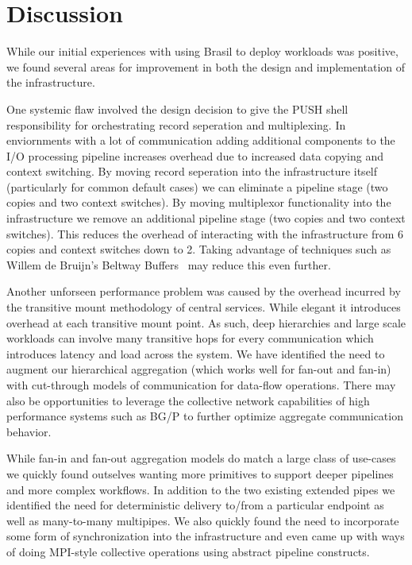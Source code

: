 \section{Discussion}

While our initial experiences with using Brasil to deploy
workloads was positive, we found several areas for improvement
in both the design and implementation of the infrastructure.

One systemic flaw involved the design decision to give the PUSH
shell responsibility for orchestrating record seperation and 
multiplexing.  In enviornments with a lot of communication 
adding additional components to the I/O processing pipeline 
increases overhead due to increased data copying and context
switching.  By moving record seperation into the infrastructure
itself (particularly for common default cases) we can eliminate
a pipeline stage (two copies and two context switches).  By moving
multiplexor functionality into the infrastructure we remove an
additional pipeline stage (two copies and two context switches).
This reduces the overhead of interacting with the infrastructure 
from 6 copies and context switches down to 2.  Taking advantage
of techniques such as Willem de Bruijn's Beltway Buffers~\cite{beltway}
may reduce this even further.

Another unforseen performance problem was caused by the overhead
incurred by the transitive mount methodology of central services.
While elegant it introduces overhead at each transitive mount point.
As such, deep hierarchies and large scale workloads can involve 
many transitive hops for every communication which introduces latency
and load across the system.  We have identified the need to augment
our hierarchical aggregation (which works well for fan-out and fan-in)
with cut-through models of communication for data-flow operations.
There may also be opportunities to leverage the collective network
capabilities of high performance systems such as BG/P to further
optimize aggregate communication behavior.

While fan-in and fan-out aggregation models do match a large class
of use-cases we quickly found outselves wanting more primitives to
support deeper pipelines and more complex workflows.  In addition
to the two existing extended pipes we identified the need for
deterministic delivery to/from a particular endpoint as well as
many-to-many multipipes.  We also quickly found the need to
incorporate some form of synchronization into the infrastructure
and even came up with ways of doing MPI-style collective operations
using abstract pipeline constructs.

